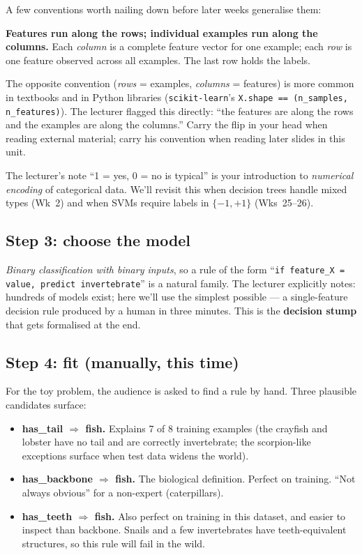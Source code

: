 \documentclass[11pt, a4paper]{article}
\begin{document}
A few conventions worth nailing down before later weeks generalise them:

\begin{defbox}
\textbf{Features run along the rows; individual examples run along the columns.} Each \emph{column} is a complete feature vector for one example; each \emph{row} is one feature observed across all examples. The last row holds the labels.
\end{defbox}

\begin{pitfallbox}
The opposite convention (\emph{rows} = examples, \emph{columns} = features) is more common in textbooks and in Python libraries (\texttt{scikit-learn}'s \texttt{X.shape == (n\_samples, n\_features)}). The lecturer flagged this directly: ``the features are along the rows and the examples are along the columns.'' Carry the flip in your head when reading external material; carry his convention when reading later slides in this unit.
\end{pitfallbox}

The lecturer's note ``1 = yes, 0 = no is typical'' is your introduction to \emph{numerical encoding} of categorical data. We'll revisit this when decision trees handle mixed types (Wk~2) and when SVMs require labels in $\{-1, +1\}$ (Wks~25--26).

\subsection{Step 3: choose the model}

\emph{Binary classification with binary inputs}, so a rule of the form ``\texttt{if feature\_X = value, predict invertebrate}'' is a natural family. The lecturer explicitly notes: hundreds of models exist; here we'll use the simplest possible — a single-feature decision rule produced by a human in three minutes. This is the \textbf{decision stump} that gets formalised at the end.

\subsection{Step 4: fit (manually, this time)}

For the toy problem, the audience is asked to find a rule by hand. Three plausible candidates surface:

\begin{itemize}
  \item \textbf{has\_tail $\Rightarrow$ fish.} Explains 7 of 8 training examples (the crayfish and lobster have no tail and are correctly invertebrate; the scorpion-like exceptions surface when test data widens the world).
  \item \textbf{has\_backbone $\Rightarrow$ fish.} The biological definition. Perfect on training. ``Not always obvious'' for a non-expert (caterpillars).
  \item \textbf{has\_teeth $\Rightarrow$ fish.} Also perfect on training in this dataset, and easier to inspect than backbone. Snails and a few invertebrates have teeth-equivalent structures, so this rule will fail in the wild.
\end{itemize}
\end{document}
